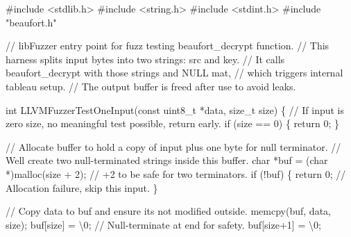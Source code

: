 \documentclass[
  a4paper,
]{scrreprt}
\newenvironment{Shaded}{\begin{snugshade}}{\end{snugshade}}
\newcommand{\CharTok}[1]{\textcolor[rgb]{0.00,0.50,0.00}{#1}}
\newcommand{\CommentTok}[1]{\textcolor[rgb]{0.41,0.41,0.41}{#1}}
\newcommand{\ControlFlowTok}[1]{\textcolor[rgb]{0.85,0.12,0.09}{#1}}
\newcommand{\DataTypeTok}[1]{\textcolor[rgb]{0.47,0.16,0.63}{#1}}
\newcommand{\DecValTok}[1]{\textcolor[rgb]{0.47,0.16,0.63}{#1}}
\newcommand{\ImportTok}[1]{\textcolor[rgb]{0.33,0.33,0.33}{#1}}
\newcommand{\NormalTok}[1]{\textcolor[rgb]{0.33,0.33,0.33}{#1}}
\newcommand{\OperatorTok}[1]{\textcolor[rgb]{0.00,0.46,0.62}{#1}}
\newcommand{\PreprocessorTok}[1]{\textcolor[rgb]{0.47,0.16,0.63}{#1}}
\newcommand{\SpecialCharTok}[1]{\textcolor[rgb]{0.00,0.46,0.62}{#1}}
\theoremstyle{definition}
\theoremstyle{remark}
\begin{document}
\begin{Shaded}
\begin{Highlighting}[numbers=left,,]
\PreprocessorTok{\#include }\ImportTok{\textless{}stdlib.h\textgreater{}}
\PreprocessorTok{\#include }\ImportTok{\textless{}string.h\textgreater{}}
\PreprocessorTok{\#include }\ImportTok{\textless{}stdint.h\textgreater{}}
\PreprocessorTok{\#include }\ImportTok{"beaufort.h"}

\CommentTok{// libFuzzer entry point for fuzz testing beaufort\_decrypt function.}
\CommentTok{// This harness splits input bytes into two strings: src and key.}
\CommentTok{// It calls beaufort\_decrypt with those strings and NULL mat,}
\CommentTok{// which triggers internal tableau setup.}
\CommentTok{// The output buffer is freed after use to avoid leaks.}

\DataTypeTok{int}\NormalTok{ LLVMFuzzerTestOneInput}\OperatorTok{(}\DataTypeTok{const} \DataTypeTok{uint8\_t} \OperatorTok{*}\NormalTok{data}\OperatorTok{,} \DataTypeTok{size\_t}\NormalTok{ size}\OperatorTok{)} \OperatorTok{\{}
    \CommentTok{// If input is zero size, no meaningful test possible, return early.}
    \ControlFlowTok{if} \OperatorTok{(}\NormalTok{size }\OperatorTok{==} \DecValTok{0}\OperatorTok{)} \OperatorTok{\{}
        \ControlFlowTok{return} \DecValTok{0}\OperatorTok{;}
    \OperatorTok{\}}

    \CommentTok{// Allocate buffer to hold a copy of input plus one byte for null terminator.}
    \CommentTok{// We\textquotesingle{}ll create two null{-}terminated strings inside this buffer.}
    \DataTypeTok{char} \OperatorTok{*}\NormalTok{buf }\OperatorTok{=} \OperatorTok{(}\DataTypeTok{char} \OperatorTok{*)}\NormalTok{malloc}\OperatorTok{(}\NormalTok{size }\OperatorTok{+} \DecValTok{2}\OperatorTok{);} \CommentTok{// +2 to be safe for two terminators.}
    \ControlFlowTok{if} \OperatorTok{(!}\NormalTok{buf}\OperatorTok{)} \OperatorTok{\{}
        \ControlFlowTok{return} \DecValTok{0}\OperatorTok{;} \CommentTok{// Allocation failure, skip this input.}
    \OperatorTok{\}}

    \CommentTok{// Copy data to buf and ensure it\textquotesingle{}s not modified outside.}
\NormalTok{    memcpy}\OperatorTok{(}\NormalTok{buf}\OperatorTok{,}\NormalTok{ data}\OperatorTok{,}\NormalTok{ size}\OperatorTok{);}
\NormalTok{    buf}\OperatorTok{[}\NormalTok{size}\OperatorTok{]} \OperatorTok{=} \CharTok{\textquotesingle{}}\SpecialCharTok{\textbackslash{}0}\CharTok{\textquotesingle{}}\OperatorTok{;} \CommentTok{// Null{-}terminate at end for safety.}
\NormalTok{    buf}\OperatorTok{[}\NormalTok{size}\OperatorTok{+}\DecValTok{1}\OperatorTok{]} \OperatorTok{=} \CharTok{\textquotesingle{}}\SpecialCharTok{\textbackslash{}0}\CharTok{\textquotesingle{}}\OperatorTok{;}


\end{Highlighting}
\end{Shaded}
\end{document}
